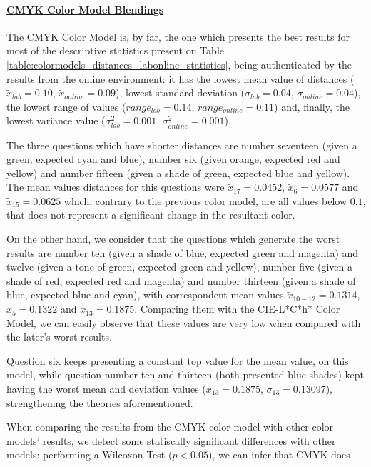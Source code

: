 \paragraph{\ul{CMYK Color Model Blendings}}
\label{par:cmykcolormodel}
%
The CMYK Color Model is, by far, the one which presents the best results for most of the descriptive statistics present on Table \ref{table:colormodels_distances_labonline_statistics}, being authenticated by the
results from the online environment: it has the lowest mean value of distances ($\tilde{x}_{lab} = 0.10$, $\tilde{x}_{online} = 0.09$), lowest standard deviation ($\sigma_{lab} = 0.04$, $\sigma_{online} = 0.04$),
the lowest range of values ($range_{lab} = 0.14$, $range_{online} = 0.11$) and, finally, the lowest variance value ($\sigma^2_{lab} = 0.001$, $\sigma^2_{online} = 0.001$). \par
%
The three questions which have shorter distances are number seventeen (given a green, expected cyan and blue), number six (given orange, expected red and yellow) and number fifteen (given a shade of green, expected blue
and yellow). The mean values distances for this questions were $\tilde{x}_{17} = 0.0452$, $\tilde{x}_{6} = 0.0577$ and $\tilde{x}_{15} = 0.0625$ which, contrary to the previous color model, are all values \ul{below $0.1$},
that does not represent a significant change in the resultant color. \par
%
On the other hand, we consider that the questions which generate the worst results are number ten (given a shade of blue, expected green and magenta) and twelve (given a tone of green, expected green and yellow), number five
(given a shade of red, expected red and magenta) and number thirteen (given a shade of blue, expected blue and cyan), with correspondent mean values $\tilde{x}_{10-12} = 0.1314$, $\tilde{x}_{5} = 0.1322$ and
$\tilde{x}_{13} = 0.1875$. Comparing them with the CIE-L*C*h* Color Model, we can easily observe that these values are very low when compared with the later's worst results. \par
%
Question six keeps presenting a constant top value for the mean value, on this model, while question number ten and thirteen (both presented blue shades) kept having the worst mean and deviation values ($\tilde{x}_{13} = 0.1875$,
$\sigma_{13} = 0.13097$), strengthening the theories aforementioned. \par
%
When comparing the results from the CMYK color model with other color models' results, we detect some statiscally significant differences with other models: performing a Wilcoxon Test ($p < 0.05$), we can infer that CMYK does
